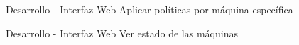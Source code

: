 \begin{frame}{Desarrollo - Interfaz Web}
    \vspace{0cm} {Aplicar políticas por máquina específica}
    \vspace{0cm}
    \begin{figure}[ht]
       \centering
    \end{figure}

\end{frame}

\begin{frame}{Desarrollo - Interfaz Web}
    \vspace{0cm} {Ver estado de las máquinas}
    \vspace{0cm}
    \begin{figure}[ht]
       \centering
    \end{figure}

\end{frame}


